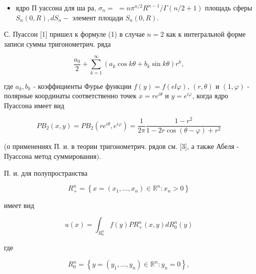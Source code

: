 \documentclass[10pt]{article}
\begin{document}
\begin{itemize}

  \item ядро П уассона для ша ра, $\sigma_{n}=$ $=n \pi^{n / 2} R^{n-1} / \Gamma(n / 2+1)$ площадь сферы $S_{n}(0, R), d S_{n}-$ элемент плоцади $S_{n}(0, R)$.

\end{itemize}



С. Пуассон [1] пришел к формуле (1) в случае $n=2$ как к интегральной форме записи суммы тригонометрич. ряда



\[

\frac{a_{0}}{2}+\sum_{k=1}^{\infty}\left(a_{k} \cos k \theta+b_{k} \sin k \theta\right) r^{k},

\]



где $a_{k}, b_{k}$ - коэффициенты Фурье функции $f(y)=f(e l \varphi)$, $(r, \theta)$ и $(1, \varphi)$ - полярные координаты соответственно точек $x=r e^{i \theta}$ и $y=e^{i \varphi}$, когда ядро Пуассона имеет вид



\[

P B_{2}(x, y)=P B_{2}\left(r e^{i \theta}, e^{i \varphi}\right)=\frac{1}{2 \pi} \frac{1-r^{2}}{1-2 r \cos (\theta-\varphi)+r^{2}}

\]



(о применениях П. и. в теории тригонометрич. рядов см. [3], а также Абеля - Пуассона метод суммирова$н и я)$.



П. и. для полупространства



\[

R_{+}^{n}=\left\{x=\left(x_{1}, \ldots, x_{n}\right) \in \mathbb{R}^{n}: x_{n}>0\right\}

\]



имеет вид



\[

u(x)=\int_{R_{0}^{n}} f(y) P R_{+}^{n}(x, y) d R_{0}^{n}(y)

\]



где



\[

R_{0}^{n}=\left\{y=\left(y_{1}, \ldots, y_{n}\right) \in \mathbb{R}^{n}: y_{n}=0\right\},

\]
\end{document}
